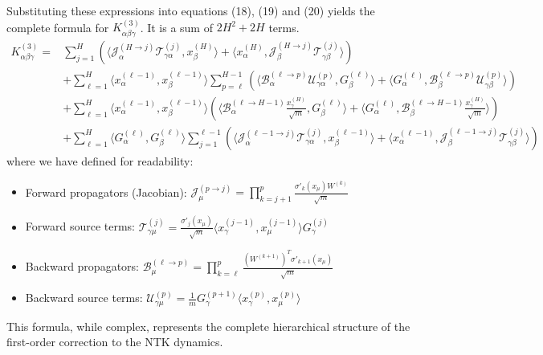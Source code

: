 \documentclass[11pt,a4paper]{article}
\theoremstyle{definition}
\begin{document}
Substituting these expressions into equations (18), (19) and (20) yields the complete formula for $K^{(3)}_{\alpha\beta\gamma}$. It is a sum of $2H^2 + 2H$ terms.
\begin{align}
K^{(3)}_{\alpha\beta\gamma} = & \sum_{j=1}^{H} \left( \langle \mathcal{J}^{(H \to j)}_{\alpha} \mathcal{T}^{(j)}_{\gamma\alpha}, x^{(H)}_\beta \rangle + \langle x^{(H)}_\alpha, \mathcal{J}^{(H \to j)}_{\beta} \mathcal{T}^{(j)}_{\gamma\beta} \rangle \right) \nonumber \\
& + \sum_{\ell=1}^{H} \langle x^{(\ell-1)}_\alpha, x^{(\ell-1)}_\beta \rangle \sum_{p=\ell}^{H-1} \left( \langle \mathcal{B}^{(\ell \to p)}_{\alpha} \mathcal{U}^{(p)}_{\gamma\alpha}, G^{(\ell)}_\beta \rangle + \langle G^{(\ell)}_\alpha, \mathcal{B}^{(\ell \to p)}_{\beta} \mathcal{U}^{(p)}_{\gamma\beta} \rangle \right) \nonumber \\
& + \sum_{\ell=1}^{H} \langle x^{(\ell-1)}_\alpha, x^{(\ell-1)}_\beta \rangle \left( \langle \mathcal{B}^{(\ell \to H-1)}_{\alpha} \frac{x^{(H)}_\gamma}{\sqrt{m}}, G^{(\ell)}_\beta \rangle + \langle G^{(\ell)}_\alpha, \mathcal{B}^{(\ell \to H-1)}_{\beta} \frac{x^{(H)}_\gamma}{\sqrt{m}} \rangle \right) \nonumber \\
& + \sum_{\ell=1}^{H} \langle G^{(\ell)}_\alpha, G^{(\ell)}_\beta \rangle \sum_{j=1}^{\ell-1} \left( \langle \mathcal{J}^{(\ell-1 \to j)}_{\alpha} \mathcal{T}^{(j)}_{\gamma\alpha}, x^{(\ell-1)}_\beta \rangle + \langle x^{(\ell-1)}_\alpha, \mathcal{J}^{(\ell-1 \to j)}_{\beta} \mathcal{T}^{(j)}_{\gamma\beta} \rangle \right)
\end{align}
where we have defined for readability:
\begin{itemize}
    \item Forward propagators (Jacobian): $\mathcal{J}^{(p \to j)}_{\mu} = \prod_{k=j+1}^{p} \frac{\sigma'_{k}(x_\mu) W^{(k)}}{\sqrt{m}}$
    \item Forward source terms: $\mathcal{T}^{(j)}_{\gamma\mu} = \frac{\sigma'_{j}(x_\mu)}{\sqrt{m}} \langle x^{(j-1)}_\gamma, x^{(j-1)}_\mu \rangle G^{(j)}_\gamma$
    \item Backward propagators: $\mathcal{B}^{(\ell \to p)}_{\mu} = \prod_{k=\ell}^{p} \frac{(W^{(k+1)})^T \sigma'_{k+1}(x_\mu)}{\sqrt{m}}$
    \item Backward source terms: $\mathcal{U}^{(p)}_{\gamma\mu} = \frac{1}{m} G^{(p+1)}_\gamma \langle x^{(p)}_\gamma, x^{(p)}_\mu \rangle$
\end{itemize}
This formula, while complex, represents the complete hierarchical structure of the first-order correction to the NTK dynamics.
\end{document}
